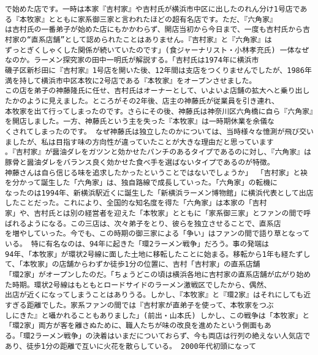 \documentclass[11pt]{article}
\begin{document}
\begin{Verbatim}[commandchars=\\\{\}]
で始めた店です。一時は本家『吉村家』や吉村氏が横浜市中区に出したのれん分け1号店である『本牧家』とともに家系御三家と言われたほどの超有名店です。ただ、『六角家』
は吉村氏の一番弟子が始めた店にもかかわらず、開店当初から今日まで、一度も吉村氏から吉村家の“直系店舗”として認められたことはありません。『吉村家』と『六角家』は
ずっとぎくしゃくした関係が続いていたのです」(食ジャーナリスト・小林孝充氏) 一体なぜなのか。ラーメン探究家の田中一明氏が解説する。「吉村氏は1974年に横浜市
磯子区新杉田に『吉村家』1号店を開いた後、12年間は支店をつくりませんでしたが、1986年満を持して横浜市中区本牧に2号店である『本牧家』をオープンさせました。
この店を弟子の神藤隆氏に任せ、吉村氏はオーナーとして、いよいよ店舗の拡大へと乗り出したかのように見えました。ところがその2年後、店主の神藤氏が従業員を引き連れ、
本牧家を出て行ってしまったのです。さらにその後、神藤氏は神奈川区六角橋に自ら『六角家』を開店しました。一方、神藤氏という主を失った『本牧家』は一時期休業を余儀な
くされてしまったのです。 なぜ神藤氏は独立したのかについては、当時様々な憶測が飛び交いましたが、私は目指す味の方向性が違っていたことが大きな理由だと思っています
。『吉村家』が醤油ダレをガツンと効かせたパンチのあるタイプであるのに対し、『六角家』は豚骨と醤油ダレをバランス良く効かせた食べ手を選ばないタイプであるのが特徴。
神藤さんは自ら信じる味を追求したかったということではないでしょうか」 「吉村家」と袂を分かって誕生した「六角家」は、独自路線で成長していった。「六角家」の転機に
なったのは1994年、新横浜駅近くに誕生した「新横浜ラーメン博物館」に横浜代表として出店したことだった。これにより、全国的な知名度を得た「六角家」は本家の「吉村
家」や、吉村氏とは別の経営者を迎えた「本牧家」とともに「家系御三家」とファンの間で呼ばれるようになる。この三店は、次々弟子をとり、彼らを独立させることで、直系店
を増やしていった。今でも、この時期の御三家による「争い」はファンの間で語り草となっている。 特に有名なのは、94年に起きた「環2ラーメン戦争」だろう。事の発端は
94年、「本牧家」が環状2号線に面した土地に移転したことに始まる。移転から1年も経たずして、「本牧家」の店舗からわずか徒歩1分の位置に、吉村「吉村家」の直系店舗
「環2家」がオープンしたのだ。「ちょうどこの頃は横浜各地に吉村家の直系店舗が広がり始めた時期。環状2号線はもともとロードサイドのラーメン激戦区でしたから、偶然、
出店が近くになってしまうことはありうる。しかし、『本牧家』と『環2家』はそれにしても近すぎる距離でした。家系ファンの間では『吉村家が直弟子を使って、本牧家をつぶ
しにきた』と囁かれることもありました」(前出・山本氏) しかし、この戦争は「本牧家」と「環2家」両方が客を離さぬために、職人たちが味の改良を進めたという側面もあ
る。「環2ラーメン戦争」の決着はいまだについておらず、今も両店は行列の絶えない人気店であり、徒歩1分の距離で互いに火花を散らしている。 2000年代初頭になって

\end{Verbatim}
\end{document}
